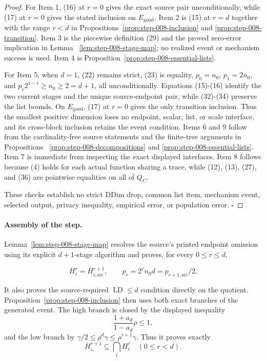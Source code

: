 \begin{proof}
For Item 1, (16) at \(r=0\) gives the exact source pair unconditionally,
while (17) at \(r=0\) gives the stated inclusion on
\(E_{\mathrm{good}}\). Item 2 is (15) at \(r=d\) together with the range
\(r<d\) in Propositions~\ref{prop:step-008-inclusion} and
\ref{prop:step-008-transition}. Item 3 is the piecewise definition (29)
and the proved zero-error implication in Lemma
~\ref{lem:step-008-stage-map}; no realized event or mechanism success is
used. Item 4 is Proposition~\ref{prop:step-008-essential-lists}.

For Item 5, when \(d=1\), (22) remains strict, (23) is equality,
\(p_0=n_0\), \(p_1=2n_0\), and
\(p_r2^{1-t}\ge n_0\ge2=d+1\), all unconditionally. Equations (15)-(16)
identify the two current stages and the unique source-endpoint pair, while
(32)-(34) preserve the list bounds. On \(E_{\mathrm{good}}\), (17) at
\(r=0\) gives the only transition inclusion. Thus the smallest positive
dimension loses no endpoint, scalar, list, or scale interface, and its
cross-block inclusion retains the event condition. Items 6 and 9 follow
from the cardinality-free source
statements and the finite-tree arguments in Propositions
~\ref{prop:step-008-decompositions} and
\ref{prop:step-008-essential-lists}. Item 7 is immediate from inspecting
the exact displayed interfaces. Item 8 follows because (4) holds for each
actual function sharing a trace, while (12), (13), (27), and (36) are
pointwise equalities on all of \(Q_C\).

These checks establish no strict DDim drop, common list item, mechanism
event, selected output, privacy inequality, empirical error, or population
error. \(\square\)


\end{proof}

\paragraph{Assembly of the step.}


Lemma~\ref{lem:step-008-stage-map} resolves the source's printed endpoint
omission using its explicit \(d+1\)-stage algorithm and proves, for every
\(0\le r\le d\),

\[
 H_i^r=H_{i,\mathrm{src}}^{r+1},
 \qquad
 p_r=2^rn_0d=p_{r+1,\mathrm{src}}/2.
\]

It also proves the source-required \(\operatorname{LD}\le d\) condition
directly on the quotient. Proposition~\ref{prop:step-008-inclusion} then
uses both exact branches of the  generated event. The high branch
is closed by the displayed inequality
\[
 \frac{1+a_d}{1-a_d}\rho\le1,
\]
and the low branch by
\(\gamma/2\le\rho^d\gamma\le\rho^{r+1}\gamma\). Thus it proves exactly
\[
 H_{i_*}^{r+1}\subseteq\bigcap_iH_i^r
 \quad(0\le r<d).
\]

